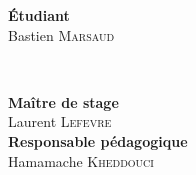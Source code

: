 \begin{titlepage}
\begin{spacing}{1}
\begin{minipage}[b]{0.48\textwidth}
\begin{flushleft} \large
\textbf{Étudiant}\\
Bastien \textsc{Marsaud}
\end{flushleft}
\end{minipage}
~
\begin{minipage}[b]{0.48\textwidth}
\begin{flushright} \large
\textbf{Maître de stage} \\
Laurent \textsc{Lefevre} \\[0.5cm]
\textbf{Responsable pédagogique} \\
Hamamache \textsc{Kheddouci}
\end{flushright}
\end{minipage}\\[2cm]

\end{spacing}
\end{titlepage}